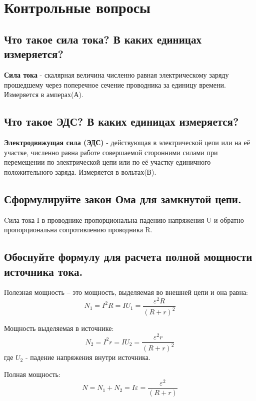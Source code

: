 \documentclass[14pt, a4paper, twoside]{extreport}
\begin{document}
\chapter{Контрольные вопросы}
\section{Что такое сила тока? В каких единицах измеряется?}

\textbf{Сила тока} - скалярная величина численно равная электрическому заряду прошедшему через поперечное сечение проводника за единицу времени. Измеряется в амперах(А).
\section{Что такое ЭДС? В каких единицах измеряется?}

\textbf{Электродвижущая сила (ЭДС)} - действующая в электрической цепи или на её участке, численно равна работе совершаемой сторонними силами при перемещении по электрической цепи или по её участку единичного положительного заряда. Измеряется в вольтах(В).
\section{Сформулируйте закон Ома для замкнутой цепи.}

Cила тока I в проводнике пропорциональна падению напряжения U и обратно пропорциональна сопротивлению проводника R.

\section{Обоснуйте формулу для расчета полной мощности источника тока.}

Полезная мощность – это мощность, выделяемая во внешней цепи и она равна:
\begin{equation}
  N_1 = I^2R = IU_1 = \frac{\varepsilon^2R}{(R+r)^2}
\end{equation}

Мощность выделяемая в источнике:
\begin{equation}
  N_2 = I^2r = IU_2 = \frac{\varepsilon^2r}{(R+r)^2}
\end{equation}
где $U_2$ - падение напряжения внутри источника.

Полная мощность:
\begin{equation}
  N = N_1 +N_2 = I\varepsilon = \frac{\varepsilon^2}{(R+r)}
\end{equation}
\end{document}
